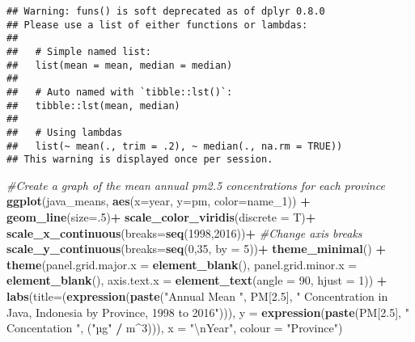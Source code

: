 \documentclass[]{article}
\newenvironment{Shaded}{\begin{snugshade}}{\end{snugshade}}
\newcommand{\CharTok}[1]{\textcolor[rgb]{0.31,0.60,0.02}{#1}}
\newcommand{\CommentTok}[1]{\textcolor[rgb]{0.56,0.35,0.01}{\textit{#1}}}
\newcommand{\DataTypeTok}[1]{\textcolor[rgb]{0.13,0.29,0.53}{#1}}
\newcommand{\DecValTok}[1]{\textcolor[rgb]{0.00,0.00,0.81}{#1}}
\newcommand{\FloatTok}[1]{\textcolor[rgb]{0.00,0.00,0.81}{#1}}
\newcommand{\KeywordTok}[1]{\textcolor[rgb]{0.13,0.29,0.53}{\textbf{#1}}}
\newcommand{\NormalTok}[1]{#1}
\newcommand{\OperatorTok}[1]{\textcolor[rgb]{0.81,0.36,0.00}{\textbf{#1}}}
\newcommand{\StringTok}[1]{\textcolor[rgb]{0.31,0.60,0.02}{#1}}
\begin{document}
\begin{verbatim}
## Warning: funs() is soft deprecated as of dplyr 0.8.0
## Please use a list of either functions or lambdas: 
## 
##   # Simple named list: 
##   list(mean = mean, median = median)
## 
##   # Auto named with `tibble::lst()`: 
##   tibble::lst(mean, median)
## 
##   # Using lambdas
##   list(~ mean(., trim = .2), ~ median(., na.rm = TRUE))
## This warning is displayed once per session.
\end{verbatim}

\begin{Shaded}
\begin{Highlighting}[]
\CommentTok{#Create a graph of the mean annual pm2.5 concentrations for each province}
\KeywordTok{ggplot}\NormalTok{(java_means, }\KeywordTok{aes}\NormalTok{(}\DataTypeTok{x=}\NormalTok{year, }\DataTypeTok{y=}\NormalTok{pm, }\DataTypeTok{color=}\NormalTok{name_}\DecValTok{1}\NormalTok{)) }\OperatorTok{+}\StringTok{ }
\StringTok{    }\KeywordTok{geom_line}\NormalTok{(}\DataTypeTok{size=}\NormalTok{.}\DecValTok{5}\NormalTok{)}\OperatorTok{+}
\StringTok{    }\KeywordTok{scale_color_viridis}\NormalTok{(}\DataTypeTok{discrete =}\NormalTok{ T)}\OperatorTok{+}
\StringTok{    }\KeywordTok{scale_x_continuous}\NormalTok{(}\DataTypeTok{breaks=}\KeywordTok{seq}\NormalTok{(}\DecValTok{1998}\NormalTok{,}\DecValTok{2016}\NormalTok{))}\OperatorTok{+}\StringTok{ }\CommentTok{#Change axis breaks}
\StringTok{    }\KeywordTok{scale_y_continuous}\NormalTok{(}\DataTypeTok{breaks=}\KeywordTok{seq}\NormalTok{(}\DecValTok{0}\NormalTok{,}\DecValTok{35}\NormalTok{, }\DataTypeTok{by =} \DecValTok{5}\NormalTok{))}\OperatorTok{+}
\StringTok{    }\KeywordTok{theme_minimal}\NormalTok{() }\OperatorTok{+}
\StringTok{    }\KeywordTok{theme}\NormalTok{(}\DataTypeTok{panel.grid.major.x =} \KeywordTok{element_blank}\NormalTok{(), }
          \DataTypeTok{panel.grid.minor.x =} \KeywordTok{element_blank}\NormalTok{(),}
          \DataTypeTok{axis.text.x =} \KeywordTok{element_text}\NormalTok{(}\DataTypeTok{angle =} \DecValTok{90}\NormalTok{, }\DataTypeTok{hjust =} \DecValTok{1}\NormalTok{)) }\OperatorTok{+}
\StringTok{    }\KeywordTok{labs}\NormalTok{(}\DataTypeTok{title=}\NormalTok{(}\KeywordTok{expression}\NormalTok{(}\KeywordTok{paste}\NormalTok{(}\StringTok{"Annual Mean "}\NormalTok{, PM[}\FloatTok{2.5}\NormalTok{], }\StringTok{" Concentration in Java, Indonesia by Province, 1998 to 2016"}\NormalTok{))),}
         \DataTypeTok{y =} \KeywordTok{expression}\NormalTok{(}\KeywordTok{paste}\NormalTok{(PM[}\FloatTok{2.5}\NormalTok{], }\StringTok{" Concentation "}\NormalTok{, (}\StringTok{"µg"} \OperatorTok{/}\StringTok{ }\NormalTok{m}\OperatorTok{^}\DecValTok{3}\NormalTok{))),}
         \DataTypeTok{x =} \StringTok{"}\CharTok{\textbackslash{}n}\StringTok{Year"}\NormalTok{,}
         \DataTypeTok{colour =} \StringTok{"Province"}\NormalTok{)}
\end{Highlighting}
\end{Shaded}
\end{document}
